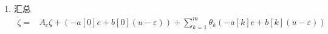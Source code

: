 \documentclass[a4paper,12pt]{article}
\begin{document}
\begin{enumerate}
\begin{align*}
        b_0 (u-\varepsilon)
         = 
        \sum_{\ell=1}^{m} \theta_{\ell}Z^{2\ell} 
        \begin{bmatrix}I_{v} \\ 0 \end{bmatrix} 
        b_0 (u-\varepsilon)
        \\ = &
        \sum_{\ell=1}^{m} \theta_{\ell} b[\ell] (u-\varepsilon)
    \end{align*}
    \item 汇总
    \begin{align*}
        \dot{\zeta}  = & 
        A_c \zeta + \left(-a[0]e+b[0](u-\varepsilon)\right) + 
        \sum_{k=1}^{m} \theta_{k} \left(-a[k]e + b[k](u-\varepsilon)\right) 
    \end{align*}
\end{enumerate}

\end{document}
